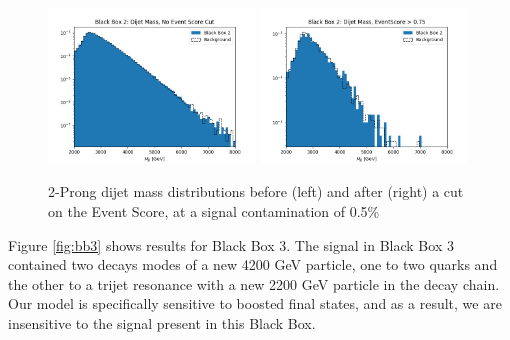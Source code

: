 \documentclass[letterpaper,11pt]{article}
\begin{document}
\begin{figure}[h!]
	\begin{center}
		\includegraphics[width=0.49\textwidth]{imgs/BB2.png}
		\includegraphics[width=0.49\textwidth]{imgs/BB2_Cut.png}
	\end{center}
	\caption{2-Prong dijet mass distributions before (left) and after (right) a cut on the Event Score, at a signal contamination of 0.5\%}
	\label{fig:bb2}
\end{figure}

Figure \ref{fig:bb3} shows results for Black Box 3. The signal in Black Box 3 contained two decays modes of a new 4200 GeV particle, one to two quarks and the other to a trijet resonance with a new 2200 GeV particle in the decay chain. Our model is specifically sensitive to boosted final states, and as a result, we are insensitive to the signal present in this Black Box. 
\end{document}
